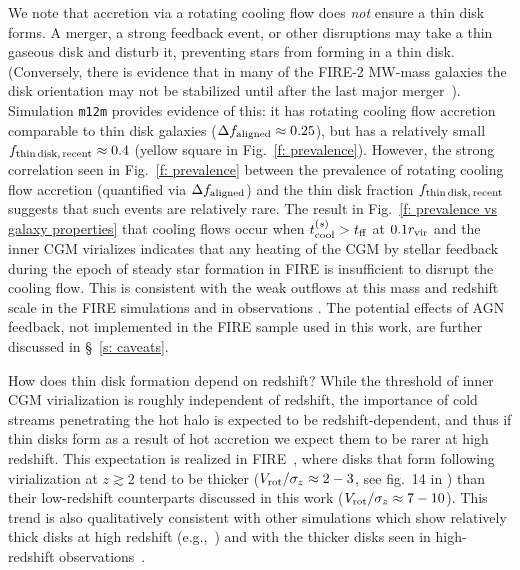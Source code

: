 \documentclass[fleqn,usenatbib]{mnras}
\newcommand{\fthin}{f_{\rm thin\,disk,\,recent}}
\newcommand{\Rvir}{r_{\rm vir}}
\begin{document}
We note that accretion via a rotating cooling flow does \textit{not} ensure a thin disk forms. 
A merger, a strong feedback event, or other disruptions may take a thin gaseous disk and disturb it, preventing stars from forming in a thin disk.
(Conversely, there is evidence that in many of the FIRE-2 MW-mass galaxies the disk orientation may not be stabilized until after the last major merger~\citealt{Santistevan2021a}).
Simulation \texttt{m12m} provides evidence of this:
it has rotating cooling flow accretion comparable to thin disk galaxies ($\Delta f_{\rm aligned} \approx 0.25$), but has a relatively small $\fthin \approx 0.4$ (yellow square in Fig.~\ref{f: prevalence}).
However, the strong correlation seen in Fig.~\ref{f: prevalence} between the prevalence of rotating cooling flow accretion (quantified via $\Delta f_{\rm aligned}$) and the thin disk fraction $\fthin$ suggests that such events are relatively rare. 
The result in Fig.~\ref{f: prevalence vs galaxy properties} that cooling flows occur when $t_{\rm cool}^{(s)}>t_{\rm ff}$ at $0.1\Rvir$ and the inner CGM virializes indicates that any heating of the CGM by stellar feedback during the epoch of steady star formation in FIRE is insufficient to disrupt the cooling flow.
This is consistent with the weak outflows at this mass and redshift scale in the FIRE simulations \citep{Muratov2015, Muratov2017, Angles-Alcazar2017, Stern2021, Pandya2021} and in observations \citep[e.g.,][]{Heckman2019}.
The potential effects of AGN feedback, not implemented in the FIRE sample used in this work, are further discussed in \S~\ref{s: caveats}. 

How does thin disk formation depend on redshift?
While the threshold of inner CGM virialization is roughly independent of redshift, the importance of cold streams penetrating the hot halo is expected to be redshift-dependent, and thus if thin disks form as a result of hot accretion we expect them to be rarer at high redshift.
This expectation is realized in FIRE~\citep{Angles-Alcazar2017a, Ma2018, Wellons2020}, where disks that form following virialization at $z\gtrsim2$ tend to be thicker ($V_{\rm rot}/\sigma_z\approx2-3$, see fig.~14 in \citealt{Stern2021}) than their low-redshift counterparts discussed in this work ($V_{\rm rot}/\sigma_z\approx7-10$).
This trend is also qualitatively consistent with other simulations which show relatively thick disks at high redshift (e.g.,~\citealt{Pillepich2019, Dekel2019}) and with the thicker disks seen in high-redshift observations~\citep[e.g.][]{Tadaki2017}.
\end{document}
